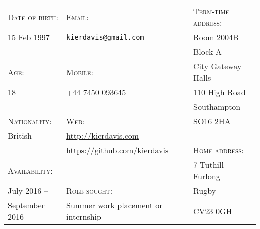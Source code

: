 \vspace{-1em}
\hrulefill
\vspace{1em}

{
\newcommand{\h}[1]{\textsc{#1}:}
\newcommand{\n}[1]{\hspace{.8em} #1}
\begin{tabu} to \textwidth {X[1.3,l] X[2.5,l] X[1.3,l]}
    \h{Date of birth}  & \h{Email}                                 & \h{Term-time address}  \\
    \n{15 Feb 1997}    & \n{\texttt{kierdavis@gmail.com}}          & \n{Room 2004B}         \\
                       &                                           & \n{Block A}            \\
    \h{Age}            & \h{Mobile}                                & \n{City Gateway Halls} \\
    \n{18}             & \n{+44 7450 093645}                       & \n{110 High Road}      \\
                       &                                           & \n{Southampton}        \\
    \h{Nationality}    & \h{Web}                                   & \n{SO16 2HA}           \\
    \n{British}        & \n{\url{http://kierdavis.com}}            &                        \\
                       & \n{\url{https://github.com/kierdavis}}    & \h{Home address}       \\
    \h{Availability}   &                                           & \n{7 Tuthill Furlong}  \\
    \n{July 2016 --}   & \h{Role sought}                           & \n{Rugby}              \\
    \n{September 2016} & \n{Summer work placement or internship}   & \n{CV23 0GH}           \\
\end{tabu}
}

\vspace{1em}
\hrulefill
